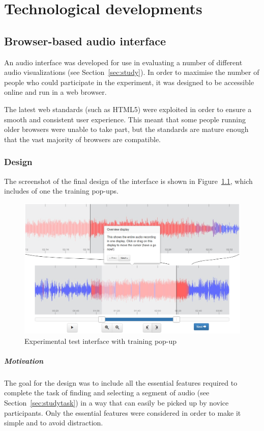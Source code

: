 \chapter{Technological developments}\label{app:tech}

\section{Browser-based audio interface}\label{sec:interface}
An audio interface was developed for use in evaluating a number of different audio visualizations (see
Section~\ref{sec:study}). In order to maximise the number of people who could participate in the experiment, it was
designed to be accessible online and run in a web browser.

The latest web standards (such as HTML5) were exploited in order to ensure a smooth and consistent user experience.
This meant that some people running older browsers were unable to take part, but the standards are mature enough that
the vast majority of browsers are compatible.

\subsection{Design}\label{sec:interfacedesign}
The screenshot of the  final design of the interface is shown in Figure~\ref{fig:interface}, which includes of one the
training pop-ups.

\begin{figure}[ht]
  \centering
  \includegraphics[width=\textwidth]{figs/interface.png}
  \caption{Experimental test interface with training pop-up}
  \label{fig:interface}
\end{figure}

\paragraph{Motivation}
The goal for the design was to include all the essential features required to complete the task of finding and
selecting a segment of audio (see Section~\ref{sec:studytask}) in a way that can easily be picked up by novice
participants. Only the essential features were considered in order to make it simple and to avoid distraction.

